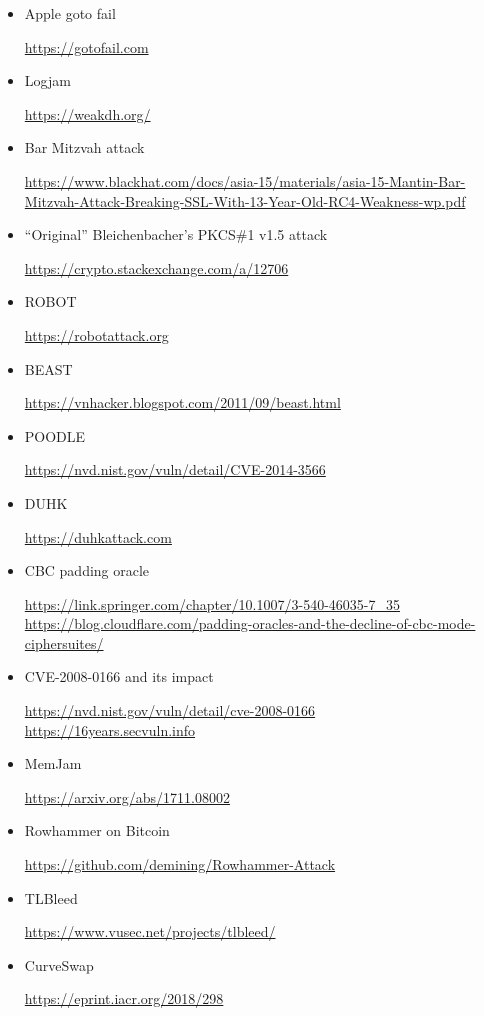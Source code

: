 \documentclass[usegeometry,parskip=half]{scrartcl}
\begin{document}
\begin{itemize}
  \item Apple goto fail
  
  \url{https://gotofail.com}

  \item Logjam
  
  \url{https://weakdh.org/}

  \item Bar Mitzvah attack
  
  \url{https://www.blackhat.com/docs/asia-15/materials/asia-15-Mantin-Bar-Mitzvah-Attack-Breaking-SSL-With-13-Year-Old-RC4-Weakness-wp.pdf}

  \item \enquote{Original} Bleichenbacher's PKCS\#1 v1.5 attack
  
  \url{https://crypto.stackexchange.com/a/12706}

  \item ROBOT
  
  \url{https://robotattack.org}

  \item BEAST
  
  \url{https://vnhacker.blogspot.com/2011/09/beast.html}

  \item POODLE
  
  \url{https://nvd.nist.gov/vuln/detail/CVE-2014-3566}

  \item DUHK
  
  \url{https://duhkattack.com}

  \item CBC padding oracle
  
  \url{https://link.springer.com/chapter/10.1007/3-540-46035-7_35}\\
  \url{https://blog.cloudflare.com/padding-oracles-and-the-decline-of-cbc-mode-ciphersuites/}

  \item CVE-2008-0166 and its impact
  
  \url{https://nvd.nist.gov/vuln/detail/cve-2008-0166}\\
  \url{https://16years.secvuln.info}

  \item MemJam
  
  \url{https://arxiv.org/abs/1711.08002}

  \item Rowhammer on Bitcoin
  
  \url{https://github.com/demining/Rowhammer-Attack}

  \item TLBleed
  
  \url{https://www.vusec.net/projects/tlbleed/}

  \item CurveSwap
  
  \url{https://eprint.iacr.org/2018/298}
\end{itemize}
\end{document}
